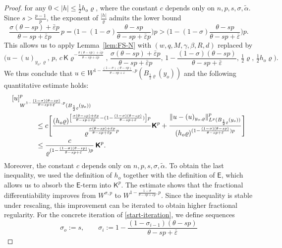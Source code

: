 \documentclass[10pt,letterpaper]{amsart}
\theoremstyle{definition}
\numberwithin{theorem}{section}
\numberwithin{equation}{section}
\newcommand{\1}{\ensuremath{\mathds{1}}}
\newcommand\sfE{{\boldsymbol{\mathsf E}}}
\newcommand\sfK{{\boldsymbol{\mathsf K}}}
\renewcommand{\epsilon}{\varepsilon}
\renewcommand{\rho}{\varrho}
\renewcommand{\epsilon}{\varepsilon}
\renewcommand{\rho}{\varrho}
\numberwithin{equation}{section}
\begin{document}
\begin{proof}
for any $0<|h|\le \frac12 h_o\rho$, where the constant \(c\) depends only on
\(n,p,s,\sigma, \tilde \alpha\).  Since \(s>\tfrac{p-1}{p}\), the exponent of 
\(\frac{|h|}{\rho}\) admits the lower bound 
\[
    \frac{\sigma(\theta-sp)+\bar\epsilon p}{\theta-sp+\bar\epsilon p} \,p  
    =
    \bigg(1-(1-\sigma)\frac{\theta-sp}{\theta-sp+\bar\epsilon p}\bigg)p
    >
    \bigg(1-(1-\sigma)\frac{\theta-sp}{\theta-sp+\bar\epsilon}\bigg)p .
\]
This allows us to apply Lemma~\ref{lem:FS-N} with
\((w,q,M,\gamma,\beta,R,d)\) replaced by
\[
\bigg(u-(u)_{y_o,\rho},\,p,\,c\,\sfK\rho^{-\frac{\sigma(\theta-sp)+\bar\epsilon p}{\theta-sp+\bar\epsilon p}}, \,\frac{\sigma(\theta-sp)+\bar\epsilon p}{\theta-sp+\bar\epsilon p}, \,1-\frac{(1-\sigma)(\theta - sp)}{\theta-sp+\bar\epsilon}, \,\tfrac12\rho,\, \tfrac12 h_o\rho\bigg). 
\]
We thus conclude that $u\in W^{1-\frac{(1-\sigma)(\theta - sp)}{\theta-sp+\bar\epsilon},p}(B_{\frac12\rho}(y_o))$ and the following quantitative estimate holds:
\begin{align}\label{start-iteration}\nonumber
    [u]_{W^{1-\frac{(1-\sigma)(\theta - sp)}{\theta-sp+\bar\epsilon},p}(B_{\frac12\rho}(y_o))}^p & \\
    &\hspace{-80pt}\leq 
    c 
    \Bigg[ \frac{(h_o\rho)^{\left[\frac{\sigma(\theta-sp)+\bar\epsilon p}{\theta-sp+\bar\epsilon p}-(1-\frac{(1-\sigma)(\theta - sp)}{\theta-sp+\bar\epsilon})\right]p} }{\rho^{\frac{\sigma(\theta-sp)+\bar\epsilon p}{\theta-sp+\bar\epsilon p}p}}\sfK^p + 
    \frac{\|u-(u)_{y_o,\rho}\|^p_{L^p(B_{\frac12 \rho}(y_o))}}{(h_o\rho)^{(1-\frac{(1-\sigma)(\theta - sp)}{\theta-sp+\bar\epsilon})p}}
    \Bigg] \nonumber\\
    &\hspace{-80pt}\le 
    \frac{c}{\rho^{(1-\frac{(1-\sigma)(\theta - sp)}{\theta-sp+\bar\epsilon})p}}\, \sfK^p.
\end{align}
Moreover, the constant \(c\) depends only on \(n,p,s,\sigma , \tilde \alpha\). To obtain the last inequality, we used the definition of \(h_o\) together
with the definition of \(\sfE\), which allows us to absorb the
$\sfE$-term into \(\sfK^p\). The estimate shows that the fractional differentiability improves from
\(W^{\sigma,p}\) to \(W^{1-\frac{1-\sigma}{\theta-sp+\bar\epsilon p},p}\).
Since the inequality is stable under rescaling, this improvement can be
iterated to obtain higher fractional regularity.
For the concrete iteration of \eqref{start-iteration}, we define sequences
\[
    \sigma_o := s, \qquad
    \sigma_i := 1-\frac{(1-\sigma_{i-1})(\theta-sp)}{\theta-sp+\bar\epsilon}
\]
\end{proof}
\end{document}
